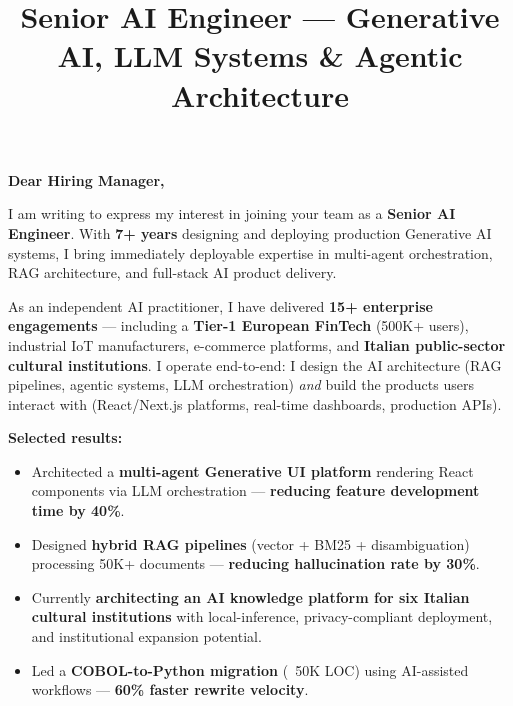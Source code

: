 \documentclass[11pt,a4paper,sans]{moderncv}
\title{Senior AI Engineer --- Generative AI, LLM Systems \& Agentic Architecture}
\begin{document}
\makecvtitle

\vspace{-1.5em}


\section{}

\textbf{Dear Hiring Manager,}
\vspace{0.8em}

I am writing to express my interest in joining your team as a \textbf{Senior AI Engineer}. With \textbf{7+ years} designing and deploying production Generative AI systems, I bring immediately deployable expertise in multi-agent orchestration, RAG architecture, and full-stack AI product delivery.

\vspace{0.5em}

As an independent AI practitioner, I have delivered \textbf{15+ enterprise engagements} --- including a \textbf{Tier-1 European FinTech} (500K+ users), industrial IoT manufacturers, e-commerce platforms, and \textbf{Italian public-sector cultural institutions}. I operate end-to-end: I design the AI architecture (RAG pipelines, agentic systems, LLM orchestration) \textit{and} build the products users interact with (React/Next.js platforms, real-time dashboards, production APIs).

\vspace{0.5em}

\textbf{Selected results:}
\vspace{0.3em}
\begin{itemize}
    \item[\textbullet] Architected a \textbf{multi-agent Generative UI platform} rendering React components via LLM orchestration --- \textbf{reducing feature development time by 40\%}.
    \item[\textbullet] Designed \textbf{hybrid RAG pipelines} (vector + BM25 + disambiguation) processing 50K+ documents --- \textbf{reducing hallucination rate by 30\%}.
    \item[\textbullet] Currently \textbf{architecting an AI knowledge platform for six Italian cultural institutions} with local-inference, privacy-compliant deployment, and institutional expansion potential.
    \item[\textbullet] Led a \textbf{COBOL-to-Python migration} (~50K LOC) using AI-assisted workflows --- \textbf{60\% faster rewrite velocity}.
\end{itemize}
\end{document}
